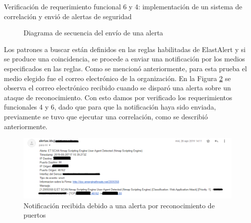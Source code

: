 \begin{section}{Verificación de requerimiento funcional 6 y 4: implementación de un sistema de correlación y envió de alertas de seguridad}
\begin{figure}[H]
        \caption{Diagrama de secuencia del envío de una alerta}
        \label{fig:iter2_diagrama_envio_alertas}
    \end{figure}
    Los patrones a buscar están definidos en las reglas habilitadas de ElastAlert y si se produce una coincidencia, se procede a enviar una notificación por los medios especificados en las reglas. Como se mencionó anteriormente, para esta prueba el medio elegido fue el correo electrónico de la organización. En la Figura \ref{fig:iter2_notificacion_alertas} se observa el correo electrónico recibido cuando se disparó una alerta sobre un ataque de reconocimiento. Con esto damos por verificado los requerimientos funcionales 4 y 6, dado que para que la notificación haya sido enviada, previamente se tuvo que ejecutar una correlación, como se describió anteriormente.
    \begin{figure}[H]
    \centering
        \includegraphics[width=1\textwidth]{./iteracion_2_imagenes/notificacion_alertas_1EDITADO.png}
        \caption{Notificación recibida debido a una alerta por reconocimiento de puertos}
        \label{fig:iter2_notificacion_alertas}
    \end{figure}
    \end{section}
